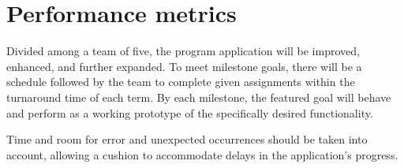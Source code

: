 \documentclass[12pt]{article}
\begin{document}
\section{Performance metrics}
Divided among a team of five, the program application will be improved, enhanced, and further expanded.
To meet milestone goals, there will be a schedule followed by the team to complete given assignments within the turnaround time of each term. By each milestone, the featured goal will behave and perform as a working prototype of the specifically desired functionality.

Time and room for error and unexpected occurrences should be taken into account, allowing a cushion to accommodate delays in the application's progress. 
 
\end{document}
